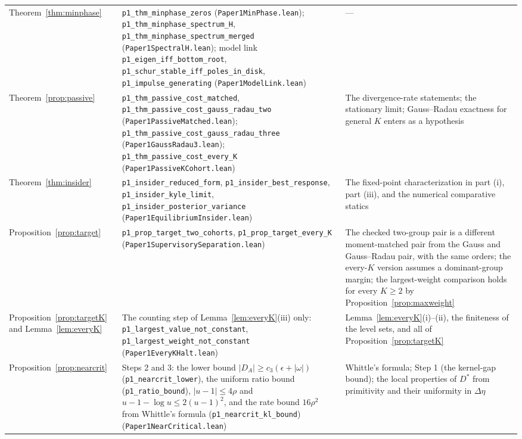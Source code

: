 \documentclass[12pt]{article}
\theoremstyle{definition}
\theoremstyle{remark}
\begin{document}
\begin{longtable}{>{\raggedright\arraybackslash}p{}>{\raggedright\arraybackslash}p{}>{\raggedright\arraybackslash}p{}}
Theorem~\ref{thm:minphase} & \texttt{p1\_thm\_minphase\_zeros} (\nolinkurl{Paper1MinPhase.lean}); \texttt{p1\_thm\_minphase\_spectrum\_H}, \texttt{p1\_thm\_minphase\_spectrum\_merged} (\nolinkurl{Paper1SpectralH.lean}); model link \texttt{p1\_eigen\_iff\_bottom\_root}, \texttt{p1\_schur\_stable\_iff\_poles\_in\_disk}, \texttt{p1\_impulse\_generating} (\nolinkurl{Paper1ModelLink.lean}) & ---\\
Theorem~\ref{prop:passive} & \texttt{p1\_thm\_passive\_cost\_matched}, \texttt{p1\_thm\_passive\_cost\_gauss\_radau\_two} (\nolinkurl{Paper1PassiveMatched.lean}); \nolinkurl{p1_thm_passive_cost_gauss_radau_three} (\nolinkurl{Paper1GaussRadau3.lean}); \texttt{p1\_thm\_passive\_cost\_every\_K} (\nolinkurl{Paper1PassiveKCohort.lean}) & The divergence-rate statements; the stationary limit; Gauss--Radau exactness for general $K$ enters as a hypothesis\\
Theorem~\ref{thm:insider} & \texttt{p1\_insider\_reduced\_form}, \texttt{p1\_insider\_best\_response}, \texttt{p1\_insider\_kyle\_limit}, \texttt{p1\_insider\_posterior\_variance} (\nolinkurl{Paper1EquilibriumInsider.lean}) & The fixed-point characterization in part (i), part (iii), and the numerical comparative statics\\
Proposition~\ref{prop:target} & \texttt{p1\_prop\_target\_two\_cohorts}, \texttt{p1\_prop\_target\_every\_K} (\nolinkurl{Paper1SupervisorySeparation.lean}) & The checked two-group pair is a different moment-matched pair from the Gauss and Gauss--Radau pair, with the same orders; the every-$K$ version assumes a dominant-group margin; the largest-weight comparison holds for every $K\ge 2$ by Proposition~\ref{prop:maxweight}\\
Proposition~\ref{prop:targetK} and Lemma~\ref{lem:everyK} & The counting step of Lemma~\ref{lem:everyK}(iii) only: \texttt{p1\_largest\_value\_not\_constant}, \texttt{p1\_largest\_weight\_not\_constant} (\nolinkurl{Paper1EveryKHalt.lean}) & Lemma~\ref{lem:everyK}(i)--(ii), the finiteness of the level sets, and all of Proposition~\ref{prop:targetK}\\
Proposition~\ref{prop:nearcrit} & Steps 2 and 3: the lower bound $|D_A|\ge c_3(\epsilon+|\omega|)$ (\texttt{p1\_nearcrit\_lower}), the uniform ratio bound (\texttt{p1\_ratio\_bound}), $|u-1|\le4\rho$ and $u-1-\log u\le2(u-1)^2$, and the rate bound $16\rho^2$ from Whittle's formula (\texttt{p1\_nearcrit\_kl\_bound}) (\nolinkurl{Paper1NearCritical.lean}) & Whittle's formula; Step 1 (the kernel-gap bound); the local properties of $D^*$ from primitivity and their uniformity in $\Delta\eta$\\

\end{longtable}
\end{document}
